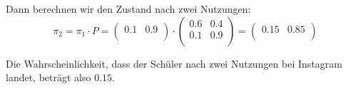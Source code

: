 \begin{myexercise}
\begin{myanswer}
        Dann berechnen wir den Zustand nach zwei Nutzungen:
        \[
            \pi_2 = \pi_1 \cdot P =
            \begin{pmatrix}
                0.1 & 0.9 \\
            \end{pmatrix}
            \cdot
            \begin{pmatrix}
                0.6 & 0.4 \\
                0.1 & 0.9 \\
            \end{pmatrix}
            =
            \begin{pmatrix}
                0.15 & 0.85 \\
            \end{pmatrix}
        \]

        Die Wahrscheinlichkeit, dass der Schüler nach zwei Nutzungen bei Instagram landet, beträgt also $0.15$.
    \end{myanswer}
\end{myexercise}

